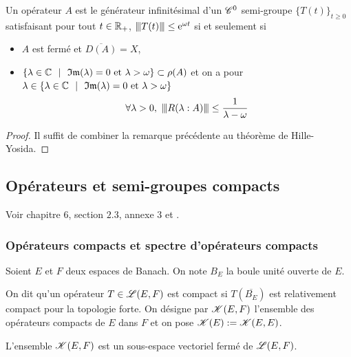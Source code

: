 \begin{corollaire}\label{cor_HY}
    Un opérateur $A$ est le générateur infinitésimal d'un $\mathscr{C}^0$ semi-groupe $\big\{T(t)\big\}_{t \geq 0}$ satisfaisant pour tout $t \in \mathbb{R}_+$, ${\left\vert\kern-0.25ex\left\vert \kern-0.25ex\left\vert T(t) \right\vert\kern-0.25ex\right\vert\kern-0.25ex\right\vert} \leq \mathrm{e}^{\omega t}$ si et seulement si 
    \begin{itemize}
        \item[$(i)$] $A$ est fermé et $\overline{D(A)}=X$,
        \item[$(ii)$] $\{\lambda \in \bbC \ \ | \ \ \Im(\lambda) = 0 \text{ et } \lambda > \omega \} \subset \rho(A)$ et on a pour $\lambda \in \{\lambda \in \mathbb{C} \ \ | \ \ \mathfrak{Im}(\lambda) = 0 \text{ et } \lambda > \omega \}$
        \begin{equation}\label{eq_H-Y}
            \forall \lambda >0, \ {\left\vert\kern-0.25ex\left\vert \kern-0.25ex\left\vert R(\lambda:A) \right\vert\kern-0.25ex\right\vert\kern-0.25ex\right\vert} \leq \frac{1}{\lambda-\omega}
        \end{equation} 
    \end{itemize}
\end{corollaire}

\begin{proof}
    Il suffit de combiner la remarque précédente au théorème de Hille-Yosida.
\end{proof}

\subsection{Opérateurs et semi-groupes compacts}
Voir \cite{Brezis1987} chapitre 6, \cite{Pazy1983} section $2.3$, \cite{Clement1987} annexe $3$ et \cite[p.~117]{Engel1991}.
\subsubsection{Opérateurs compacts et spectre d'opérateurs compacts}
Soient $E$ et $F$ deux espaces de Banach. On note $B_E$ la boule unité ouverte de $E$.
\begin{definition}
    On dit qu'un opérateur $T \in \mathscr{L}(E,F)$ est \textcolor{astral}{compact} si $T(\overline{B_E})$ est relativement compact pour la topologie forte. On désigne par $\mathscr{K}(E,F)$ l'ensemble des opérateurs compacts de $E$ dans $F$ et on pose $\mathscr{K}(E):=\mathscr{K}(E,E)$.
\end{definition}

\begin{proposition}\label{prop_op_compact_ferme}
    L'ensemble $\mathscr{K}(E,F)$ est un sous-espace vectoriel fermé de $\mathscr{L}(E,F)$.
\end{proposition}

